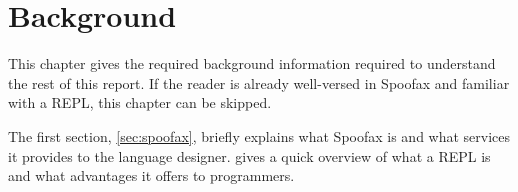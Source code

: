 \chapter{Background}
\label{cha:background}

This chapter gives the required background information required to
understand the rest of this report. If the reader is already well-versed in
Spoofax and familiar with a REPL, this chapter can be skipped.

The first section, \cref{sec:spoofax}, briefly explains what Spoofax is and what
services it provides to the language designer.  gives a quick
overview of what a REPL is and what advantages it offers to programmers.





